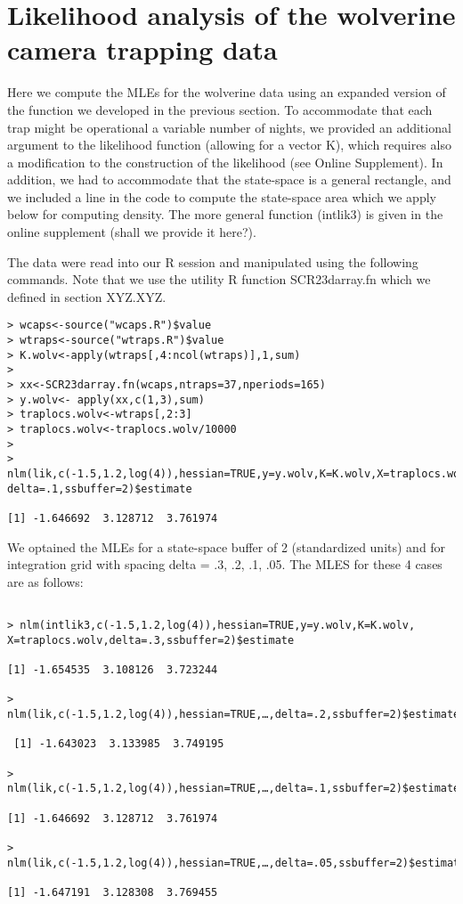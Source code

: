 \section{Likelihood analysis of the wolverine camera trapping data}

Here we compute the MLEs for the wolverine data using an expanded
version of the function we developed in the previous section. To
accommodate that each trap might be operational a variable number of
nights, we provided an additional argument to the likelihood function
(allowing for a vector K), which requires also a modification to the
construction of the likelihood (see Online Supplement).  In addition,
we had to accommodate that the state-space is a general rectangle, and
we included a line in the code to compute the state-space area which
we apply below for computing density.  The more general function
(intlik3) is given in the online supplement (shall we provide it
here?).

The data were read into our R session and manipulated using the
following commands. Note that we use the utility R function
SCR23darray.fn which we defined in section XYZ.XYZ.

\begin{verbatim}
> wcaps<-source("wcaps.R")$value
> wtraps<-source("wtraps.R")$value
> K.wolv<-apply(wtraps[,4:ncol(wtraps)],1,sum)
> 
> xx<-SCR23darray.fn(wcaps,ntraps=37,nperiods=165)
> y.wolv<- apply(xx,c(1,3),sum)
> traplocs.wolv<-wtraps[,2:3]
> traplocs.wolv<-traplocs.wolv/10000
>
> nlm(lik,c(-1.5,1.2,log(4)),hessian=TRUE,y=y.wolv,K=K.wolv,X=traplocs.wolv,
delta=.1,ssbuffer=2)$estimate

[1] -1.646692  3.128712  3.761974

\end{verbatim}

We optained the MLEs for a state-space buffer of 2 (standardized units) and for integration grid with spacing delta = .3, .2, .1, .05. The MLES for these 4 cases are as follows:

\begin{verbatim}

> nlm(intlik3,c(-1.5,1.2,log(4)),hessian=TRUE,y=y.wolv,K=K.wolv, X=traplocs.wolv,delta=.3,ssbuffer=2)$estimate

[1] -1.654535  3.108126  3.723244

> nlm(lik,c(-1.5,1.2,log(4)),hessian=TRUE,…,delta=.2,ssbuffer=2)$estimate

 [1] -1.643023  3.133985  3.749195

> nlm(lik,c(-1.5,1.2,log(4)),hessian=TRUE,…,delta=.1,ssbuffer=2)$estimate

[1] -1.646692  3.128712  3.761974

> nlm(lik,c(-1.5,1.2,log(4)),hessian=TRUE,…,delta=.05,ssbuffer=2)$estimate

[1] -1.647191  3.128308  3.769455

\end{verbatim}

